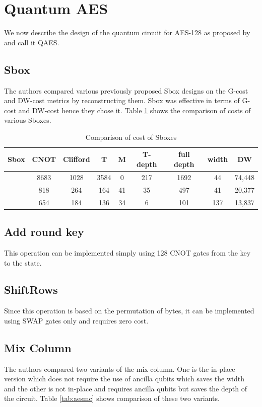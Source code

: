 \documentclass[preprint]{transcrypto}
\begin{document}
\section{Quantum AES}\label{sec:qaes}
We now describe the design of the quantum circuit for AES-128 as proposed by \cite{aeslowmc} and call it QAES.

\subsection{Sbox}

The authors compared various previously proposed Sbox designs on the G-cost and DW-cost metrics by reconstructing them. \cite{aessbox} Sbox was effective in terms of G-cost and DW-cost hence they chose it. Table \ref{tab:aessboxcost} shows the comparison of costs of various Sboxes.

\begin{center}
\begin{table}[h!]
    \centering
    \begin{tabular}{ |c|c|c|c|c|c|c|c|c| } 
     \hline
     Sbox & CNOT & Clifford & T & M & T-depth & full depth & width & DW \\ \hline
    \cite{aessbox2}  & 8683 & 1028&3584&0&217&1692&44&74,448 \\ \hline
     \cite{aessbox1} & 818&264&164&41&35&497&41&20,377 \\ \hline
     \cite{aessbox} & 654&184&136&34&6&101&137&13,837 \\ \hline
    \end{tabular}
    \caption{Comparison of cost of Sboxes}
    \label{tab:aessboxcost}
\end{table}
\end{center}

\subsection{Add round key}
This operation can be implemented simply using 128 CNOT gates from the key to the state.

\subsection{ShiftRows}
Since this operation is based on the permutation of bytes, it can be implemented using SWAP gates only and requires zero cost.

\subsection{Mix Column}
The authors compared two variants of the mix column. One is the in-place version which does not require the use of ancilla qubits which saves the width and the other is not in-place and requires ancilla qubits but saves the depth of the circuit. Table \ref{tab:aesmc} shows comparison of these two variants.
\end{document}
